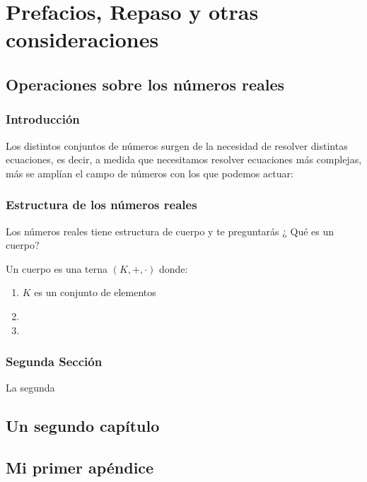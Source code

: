 \part{Prefacios, Repaso y otras consideraciones}



\chapter{Operaciones sobre los números reales}

\minitoc

 
\section*{Introducción} 

Los distintos conjuntos de números surgen de la necesidad de resolver distintas ecuaciones, es decir, a medida que necesitamos resolver ecuaciones más complejas, más se amplían el campo de números con los que podemos actuar:
 
\section{Estructura de los números reales}
Los números reales tiene estructura de cuerpo y te preguntarás ¿ Qué es un cuerpo?
\begin{defi}
Un cuerpo es una terna $(K,+,\cdot)$ donde:
\begin{enumerate}
\item $K$ es un conjunto de elementos 
\item
\item
\end{enumerate}
\end{defi}



\section{Segunda Secci\'on}
La segunda 

\chapter{Un segundo cap\'itulo}
%
\minitoc%

\section{}
\section{}


\appendix
\chapter{Mi primer ap\'endice}
